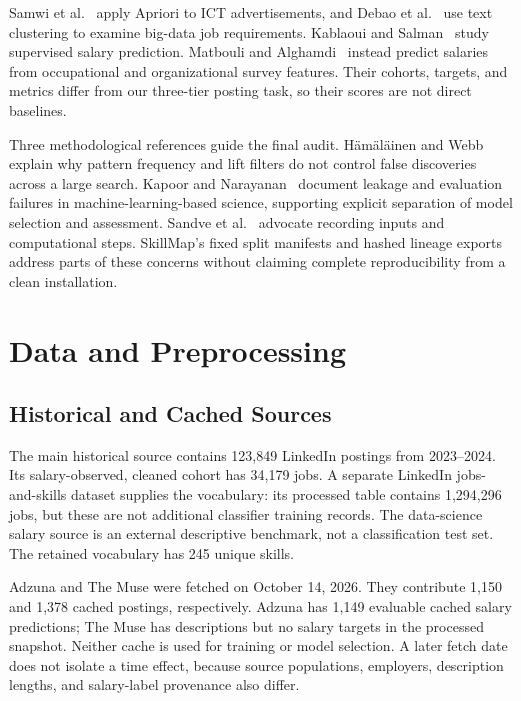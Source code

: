 \documentclass[sigconf,nonacm]{acmart}
\begin{document}
Samwi et al.~\cite{samwi2024} apply Apriori to ICT advertisements, and Debao et al.~\cite{debao2021} use text clustering to examine big-data job requirements. Kablaoui and Salman~\cite{kablaoui2022} study supervised salary prediction. Matbouli and Alghamdi~\cite{matbouli2022} instead predict salaries from occupational and organizational survey features. Their cohorts, targets, and metrics differ from our three-tier posting task, so their scores are not direct baselines.

Three methodological references guide the final audit. H\"am\"al\"ainen and Webb~\cite{hamalainen2019} explain why pattern frequency and lift filters do not control false discoveries across a large search. Kapoor and Narayanan~\cite{kapoor2023} document leakage and evaluation failures in machine-learning-based science, supporting explicit separation of model selection and assessment. Sandve et al.~\cite{sandve2013} advocate recording inputs and computational steps. SkillMap's fixed split manifests and hashed lineage exports address parts of these concerns without claiming complete reproducibility from a clean installation.

\section{Data and Preprocessing}
\subsection{Historical and Cached Sources}
The main historical source contains 123,849 LinkedIn postings from 2023--2024. Its salary-observed, cleaned cohort has 34,179 jobs. A separate LinkedIn jobs-and-skills dataset supplies the vocabulary: its processed table contains 1,294,296 jobs, but these are not additional classifier training records. The data-science salary source is an external descriptive benchmark, not a classification test set. The retained vocabulary has 245 unique skills.

Adzuna and The Muse were fetched on October 14, 2026. They contribute 1,150 and 1,378 cached postings, respectively. Adzuna has 1,149 evaluable cached salary predictions; The Muse has descriptions but no salary targets in the processed snapshot. Neither cache is used for training or model selection. A later fetch date does not isolate a time effect, because source populations, employers, description lengths, and salary-label provenance also differ.
\end{document}
